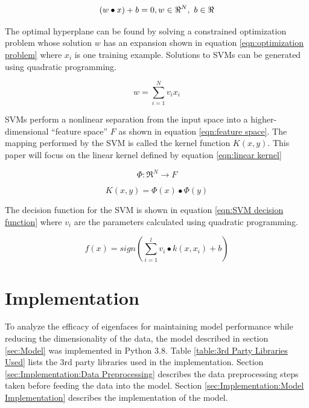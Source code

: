 \documentclass[journal]{new-aiaa}
\begin{document}
\begin{equation}\label{eqn:hyperplane class}
  (w \bullet x) + b = 0,\\ w \in \Re^N,\ b\in \Re
\end{equation}

The optimal hyperplane can be found by solving a constrained optimization problem whose solution $w$ has an expansion shown in equation \ref{eqn:optimization problem} where $x_i$ is one training example.
Solutions to SVMs can be generated using quadratic programming.

\begin{equation}\label{eqn:optimization problem}
  w=\sum_{i = 1}^{N} v_i x_i 
\end{equation}

SVMs perform a nonlinear separation from the input space into a higher-dimensional ``feature space'' $F$ as shown in equation \ref{eqn:feature space}.
The mapping performed by the SVM is called the kernel function $K(x, y)$.
This paper will focus on the linear kernel defined by equation \ref{eqn:linear kernel}

\begin{equation}\label{eqn:feature space}
  \Phi : \Re^N \rightarrow F
\end{equation}

\begin{equation}\label{eqn:linear kernel}
  K(x, y) = \Phi (x) \bullet \Phi (y)
\end{equation}

The decision function for the SVM is shown in equation \ref{eqn:SVM decision function} where $v_i$ are the parameters calculated using quadratic programming.

\begin{equation}\label{eqn:SVM decision function}
  f(x) = sign\left(\sum_{i = 1}^{l} v_i \bullet k(x, x_i) + b \right)
\end{equation}

\section{Implementation}\label{sec:Implementation}
To analyze the efficacy of eigenfaces for maintaining model performance while reducing the dimensionality of the data, the model described in section \ref{sec:Model} was implemented in Python 3.8.
Table \ref{table:3rd Party Libraries Used} lists the 3rd party libraries used in the implementation.
Section \ref{sec:Implementation:Data Preprocessing} describes the data preprocessing steps taken before feeding the data into the model.
Section \ref{sec:Implementation:Model Implementation} describes the implementation of the model.
\end{document}
